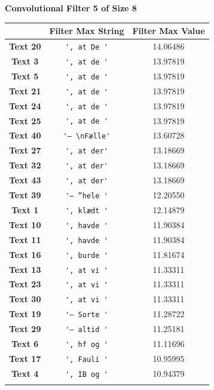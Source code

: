 \begin{table}
    \centering
    \textbf{Convolutional Filter 5 of Size 8}\par\medskip
    \begin{tabular}{c|cc}
        & \textbf{Filter Max String} & \textbf{Filter Max Value} \\ \hline
        \textbf{Text 20} & \verb{', at De '{ & 14.06486 \\
        \textbf{Text 3} & \verb{', at de '{ & 13.97819 \\
        \textbf{Text 5} & \verb{', at de '{ & 13.97819 \\
        \textbf{Text 21} & \verb{', at de '{ & 13.97819 \\
        \textbf{Text 24} & \verb{', at de '{ & 13.97819 \\
        \textbf{Text 25} & \verb{', at de '{ & 13.97819 \\
        \textbf{Text 40} & \verb{'– \nFælle'{ & 13.60728 \\
        \textbf{Text 27} & \verb{', at der'{ & 13.18669 \\
        \textbf{Text 32} & \verb{', at der'{ & 13.18669 \\
        \textbf{Text 43} & \verb{', at der'{ & 13.18669 \\
        \textbf{Text 39} & \verb{'– ”hele '{ & 12.20550 \\
        \textbf{Text 1} & \verb{', klædt '{ & 12.14879 \\
        \textbf{Text 10} & \verb{', havde '{ & 11.90384 \\
        \textbf{Text 11} & \verb{', havde '{ & 11.90384 \\
        \textbf{Text 16} & \verb{', burde '{ & 11.81674 \\
        \textbf{Text 13} & \verb{', at vi '{ & 11.33311 \\
        \textbf{Text 23} & \verb{', at vi '{ & 11.33311 \\
        \textbf{Text 30} & \verb{', at vi '{ & 11.33311 \\
        \textbf{Text 19} & \verb{'– Sorte '{ & 11.28722 \\
        \textbf{Text 29} & \verb{'– altid '{ & 11.25181 \\
        \textbf{Text 6} & \verb{', hf og '{ & 11.11696 \\
        \textbf{Text 17} & \verb{', Fauli '{ & 10.95995 \\
        \textbf{Text 4} & \verb{', IB og '{ & 10.94379 \\
}}}}}}}}}}}}}}}}}}}}}}}
\end{tabular}
\end{table}
